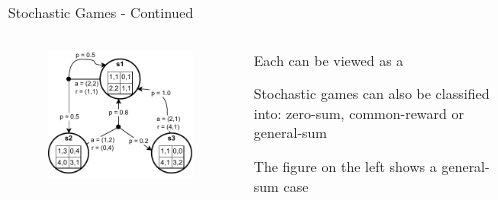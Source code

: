 \begin{frame}{Stochastic Games - Continued}
    
    \begin{columns}
    \begin{column}{0.5\linewidth}
    \begin{figure}
        \centering
        \includegraphics{images/chapter_3/game-models-sg.pdf}
        \label{fig:enter-label}
    \end{figure}
    \end{column}
    \vspace{10pt}
    \begin{column}{0.5\linewidth}

    \blist
        \item Each  can be viewed as a 
        \item Stochastic games can also be classified into: zero-sum, common-reward or general-sum
        \item The figure on the left shows a general-sum case 
    \elist
        
    \end{column}
    \end{columns}
\end{frame}

